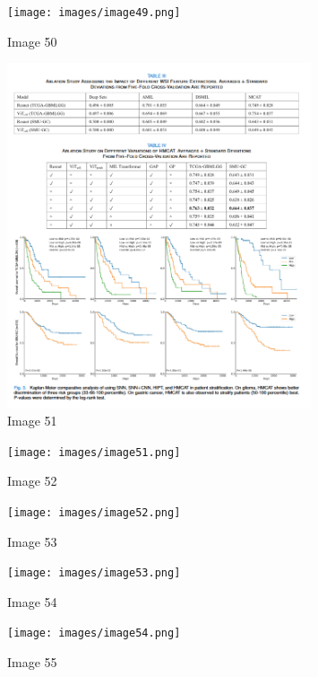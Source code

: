 \documentclass{article}%
\begin{document}
\begin{figure}[h!]%
\centering%
\texttt{[image: images/image49.png]}%
\caption{Image 50}%
\end{figure}

%


\begin{figure}[h!]%
\centering%
\includegraphics[width=0.8\textwidth]{images/image50.png}%
\caption{Image 51}%
\end{figure}

%


\begin{figure}[h!]%
\centering%
\texttt{[image: images/image51.png]}%
\caption{Image 52}%
\end{figure}

%


\begin{figure}[h!]%
\centering%
\texttt{[image: images/image52.png]}%
\caption{Image 53}%
\end{figure}

%


\begin{figure}[h!]%
\centering%
\texttt{[image: images/image53.png]}%
\caption{Image 54}%
\end{figure}

%


\begin{figure}[h!]%
\centering%
\texttt{[image: images/image54.png]}%
\caption{Image 55}%
\end{figure}
\end{document}
